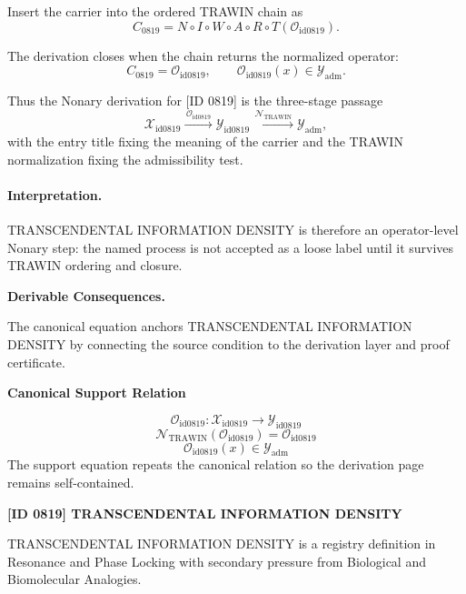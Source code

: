 Insert the carrier into the ordered TRAWIN chain as\[
C_{0819}=N\circ I\circ W\circ A\circ R\circ T(\mathcal{O}_{\mathrm{id0819}}).
\]

The derivation closes when the chain returns the normalized operator:\[
C_{0819}=\mathcal{O}_{\mathrm{id0819}},\qquad \mathcal{O}_{\mathrm{id0819}}(x)\in\mathcal{Y}_{\mathrm{adm}}.
\]

Thus the Nonary derivation for [ID 0819] is the three-stage passage
\[
\mathcal{X}_{\mathrm{id0819}}\xrightarrow{\,\mathcal{O}_{\mathrm{id0819}}\,} \mathcal{Y}_{\mathrm{id0819}}\xrightarrow{\,\mathcal{N}_{\mathrm{TRAWIN}}\,} \mathcal{Y}_{\mathrm{adm}},
\]
with the entry title fixing the meaning of the carrier and the TRAWIN normalization fixing the admissibility test.

\paragraph{Interpretation.} TRANSCENDENTAL INFORMATION DENSITY is therefore an operator-level Nonary step: the named process is not accepted as a loose label until it survives TRAWIN ordering and closure.

\par\vspace{0.35em}
\noindent\textbf{Derivable Consequences.}\quad
\begingroup
\footnotesize
\raggedright
The canonical equation anchors TRANSCENDENTAL INFORMATION DENSITY by connecting the source condition to the derivation layer and proof certificate.
\par\endgroup

\noindent\textbf{Canonical Support Relation}\par
\[
\mathcal{O}_{\mathrm{id0819}}:\mathcal{X}_{\mathrm{id0819}}\longrightarrow\mathcal{Y}_{\mathrm{id0819}}
\]
\[
\mathcal{N}_{\mathrm{TRAWIN}}(\mathcal{O}_{\mathrm{id0819}})=\mathcal{O}_{\mathrm{id0819}}
\]
\[
\mathcal{O}_{\mathrm{id0819}}(x)\in\mathcal{Y}_{\mathrm{adm}}
\]
\noindent The support equation repeats the canonical relation so the derivation page remains self-contained.\par

\clearpage
\noindent\textbf{[ID 0819] TRANSCENDENTAL INFORMATION DENSITY}\par
\vspace{0.35em}
\begingroup\small
{}
TRANSCENDENTAL INFORMATION DENSITY is a registry definition in Resonance and Phase Locking with secondary pressure from Biological and Biomolecular Analogies.

